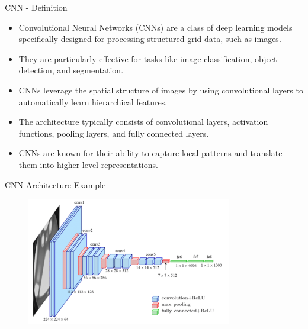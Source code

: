 \begin{frame}[allowframebreaks]{CNN - Definition}
\begin{itemize}
    \item Convolutional Neural Networks (CNNs) are a class of deep learning models specifically designed for processing structured grid data, such as images.
    \item They are particularly effective for tasks like image classification, object detection, and segmentation.
    \item CNNs leverage the spatial structure of images by using convolutional layers to automatically learn hierarchical features.
    \item The architecture typically consists of convolutional layers, activation functions, pooling layers, and fully connected layers.
    \item CNNs are known for their ability to capture local patterns and translate them into higher-level representations.
\end{itemize}
\end{frame}  

\begin{frame}{CNN Architecture Example}
    \begin{figure}
    \centering
    \includegraphics[width=0.8\textwidth,height=0.8\textheight,keepaspectratio]{images/cnn-arch.png}
    \end{figure}
\end{frame}
